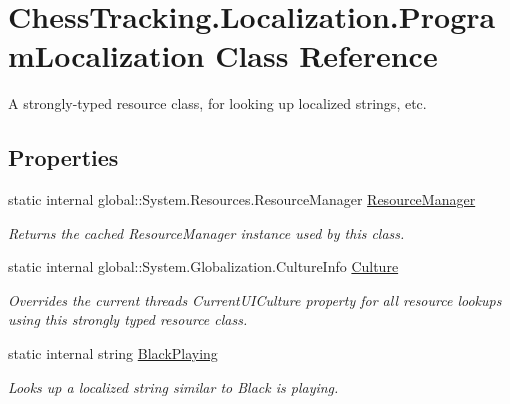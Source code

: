 \hypertarget{class_chess_tracking_1_1_localization_1_1_program_localization}{}\section{Chess\+Tracking.\+Localization.\+Program\+Localization Class Reference}
\label{class_chess_tracking_1_1_localization_1_1_program_localization}


A strongly-\/typed resource class, for looking up localized strings, etc.  


\subsection*{Properties}
\begin{DoxyCompactItemize}
\item 
static internal global\+::\+System.\+Resources.\+Resource\+Manager \mbox{\hyperlink{class_chess_tracking_1_1_localization_1_1_program_localization_abd0fa9b024230ab8f1c585669224fd14}{Resource\+Manager}}
\begin{DoxyCompactList}\small\item\em Returns the cached Resource\+Manager instance used by this class. \end{DoxyCompactList}\item 
static internal global\+::\+System.\+Globalization.\+Culture\+Info \mbox{\hyperlink{class_chess_tracking_1_1_localization_1_1_program_localization_aaf2ff633f1ecefd4336b40becf6829f7}{Culture}}
\begin{DoxyCompactList}\small\item\em Overrides the current thread\textquotesingle{}s Current\+U\+I\+Culture property for all resource lookups using this strongly typed resource class. \end{DoxyCompactList}\item 
static internal string \mbox{\hyperlink{class_chess_tracking_1_1_localization_1_1_program_localization_a1748db18fb14544545b3b9afd1515da6}{Black\+Playing}}
\begin{DoxyCompactList}\small\item\em Looks up a localized string similar to Black is playing. \end{DoxyCompactList}\item 

\end{DoxyCompactItemize}
